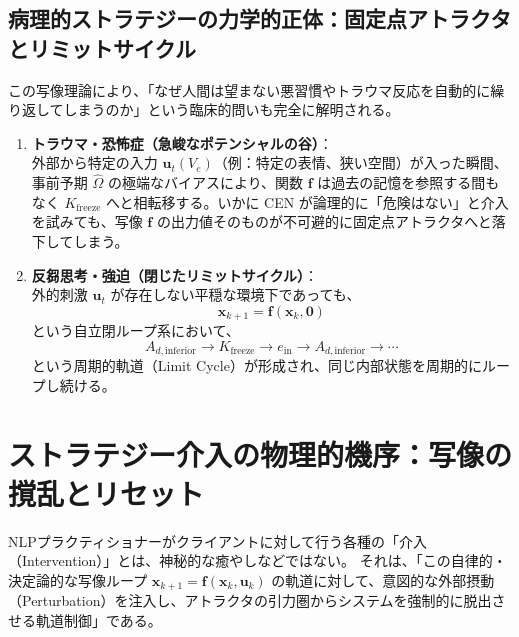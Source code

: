\subsection{病理的ストラテジーの力学的正体：固定点アトラクタとリミットサイクル}
この写像理論により、「なぜ人間は望まない悪習慣やトラウマ反応を自動的に繰り返してしまうのか」という臨床的問いも完全に解明される。

\begin{enumerate}
    \item \textbf{トラウマ・恐怖症（急峻なポテンシャルの谷）}：\\
    外部から特定の入力 $\boldsymbol{u}_t(V_e)$（例：特定の表情、狭い空間）が入った瞬間、事前予期 $\hat{\Omega}$ の極端なバイアスにより、関数 $\boldsymbol{f}$ は過去の記憶を参照する間もなく $K_{\mathrm{freeze}}$ へと相転移する。いかに CEN が論理的に「危険はない」と介入を試みても、写像 $\boldsymbol{f}$ の出力値そのものが不可避的に固定点アトラクタへと落下してしまう。
    
    \item \textbf{反芻思考・強迫（閉じたリミットサイクル）}：\\
    外的刺激 $\boldsymbol{u}_t$ が存在しない平穏な環境下であっても、
    \begin{equation}
        \boldsymbol{x}_{k+1} = \boldsymbol{f}(\boldsymbol{x}_k, \boldsymbol{0})
    \end{equation}
    という自立閉ループ系において、
    \begin{equation}
        A_{d,\mathrm{inferior}} \longrightarrow K_{\mathrm{freeze}} \longrightarrow e_{\mathrm{in}} \longrightarrow A_{d,\mathrm{inferior}} \longrightarrow \cdots
    \end{equation}
    という周期的軌道（Limit Cycle）が形成され、同じ内部状態を周期的にループし続ける。
\end{enumerate}

\section{ストラテジー介入の物理的機序：写像の撹乱とリセット}

NLPプラクティショナーがクライアントに対して行う各種の「介入（Intervention）」とは、神秘的な癒やしなどではない。
それは、「この自律的・決定論的な写像ループ $\boldsymbol{x}_{k+1} = \boldsymbol{f}(\boldsymbol{x}_k, \boldsymbol{u}_k)$ の軌道に対して、意図的な外部摂動（Perturbation）を注入し、アトラクタの引力圏からシステムを強制的に脱出させる軌道制御」である。

